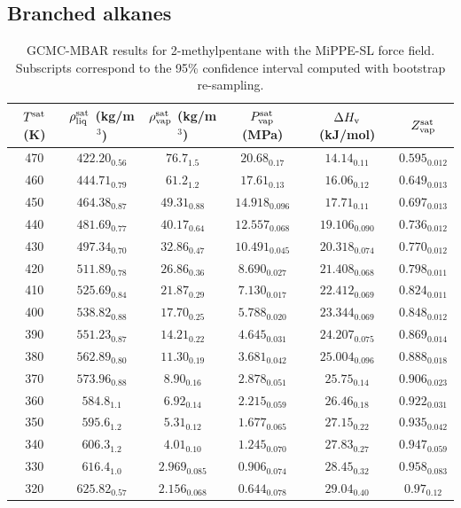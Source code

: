\documentclass[journal=jctc,manuscript=article]{achemso}
\begin{document}
\subsection{Branched alkanes}

\begin{table}[htb!]
	\caption{GCMC-MBAR results for 2-methylpentane with the MiPPE-SL force field. Subscripts correspond to the 95\% confidence interval computed with bootstrap re-sampling.}
	\begin{center}
		\begin{tabular}{|c|c|c|c|c|c|}
			\hline
			$T^{\rm sat}$ (K) & $\rho_{\rm liq}^{\rm sat}$ (kg/m$^3$) & $\rho_{\rm vap}^{\rm sat}$ (kg/m$^3$) & $P_{\rm vap}^{\rm sat}$ (MPa) & $\Delta H_{\rm v}$ (kJ/mol) & $Z_{\rm vap}^{\rm sat}$ \\ \hline
			470 & $422.20_{0.56}$ & $76.7_{1.5}$ & $20.68_{0.17}$ & $14.14_{0.11}$ & $0.595_{0.012}$ \\
			460 & $444.71_{0.79}$ & $61.2_{1.2}$ & $17.61_{0.13}$ & $16.06_{0.12}$ & $0.649_{0.013}$ \\
			450 & $464.38_{0.87}$ & $49.31_{0.88}$ & $14.918_{0.096}$ & $17.71_{0.11}$ & $0.697_{0.013}$ \\
			440 & $481.69_{0.77}$ & $40.17_{0.64}$ & $12.557_{0.068}$ & $19.106_{0.090}$ & $0.736_{0.012}$ \\
			430 & $497.34_{0.70}$ & $32.86_{0.47}$ & $10.491_{0.045}$ & $20.318_{0.074}$ & $0.770_{0.012}$ \\
			420 & $511.89_{0.78}$ & $26.86_{0.36}$ & $8.690_{0.027}$ & $21.408_{0.068}$ & $0.798_{0.011}$ \\
			410 & $525.69_{0.84}$ & $21.87_{0.29}$ & $7.130_{0.017}$ & $22.412_{0.069}$ & $0.824_{0.011}$ \\
			400 & $538.82_{0.88}$ & $17.70_{0.25}$ & $5.788_{0.020}$ & $23.344_{0.069}$ & $0.848_{0.012}$ \\
			390 & $551.23_{0.87}$ & $14.21_{0.22}$ & $4.645_{0.031}$ & $24.207_{0.075}$ & $0.869_{0.014}$ \\
			380 & $562.89_{0.80}$ & $11.30_{0.19}$ & $3.681_{0.042}$ & $25.004_{0.096}$ & $0.888_{0.018}$ \\
			370 & $573.96_{0.88}$ & $8.90_{0.16}$ & $2.878_{0.051}$ & $25.75_{0.14}$ & $0.906_{0.023}$ \\
			360 & $584.8_{1.1}$ & $6.92_{0.14}$ & $2.215_{0.059}$ & $26.46_{0.18}$ & $0.922_{0.031}$ \\
			350 & $595.6_{1.2}$ & $5.31_{0.12}$ & $1.677_{0.065}$ & $27.15_{0.22}$ & $0.935_{0.042}$ \\
			340 & $606.3_{1.2}$ & $4.01_{0.10}$ & $1.245_{0.070}$ & $27.83_{0.27}$ & $0.947_{0.059}$ \\
			330 & $616.4_{1.0}$ & $2.969_{0.085}$ & $0.906_{0.074}$ & $28.45_{0.32}$ & $0.958_{0.083}$ \\
			320 & $625.82_{0.57}$ & $2.156_{0.068}$ & $0.644_{0.078}$ & $29.04_{0.40}$ & $0.97_{0.12}$ \\
			\hline
		\end{tabular}
	\end{center}
\end{table}
\end{document}
